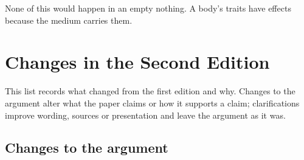\documentclass[11pt,a4paper]{article}
\begin{document}
None of this would happen in an empty nothing. A body's traits have effects because the medium carries them.

\clearpage
\section*{Changes in the Second Edition}

This list records what changed from the first edition and why. Changes to the argument alter what the paper claims or how it supports a claim; clarifications improve wording, sources or presentation and leave the argument as it was.

\subsection*{Changes to the argument}
\end{document}
